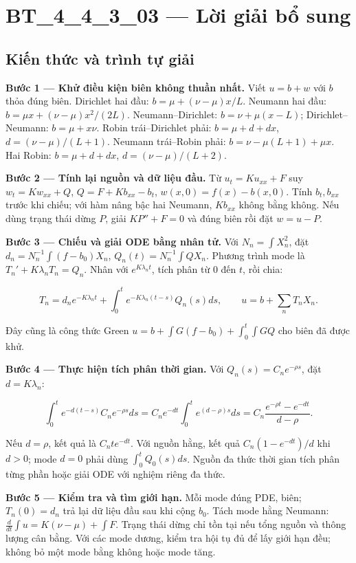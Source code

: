 \documentclass[10pt,a4paper]{article}
\begin{document}
\section*{BT\_4\_4\_3\_03 — Lời giải bổ sung}
\subsection*{Kiến thức và trình tự giải}
\textbf{Bước 1 — Khử điều kiện biên không thuần nhất.} Viết $u=b+w$ với $b$ thỏa đúng biên. Dirichlet hai đầu: $b=\mu+(\nu-\mu)x/L$. Neumann hai đầu: $b=\mu x+(\nu-\mu)x^2/(2L)$. Neumann–Dirichlet: $b=\nu+\mu(x-L)$; Dirichlet–Neumann: $b=\mu+x\nu$. Robin trái–Dirichlet phải: $b=\mu+d+dx$, $d=(\nu-\mu)/(L+1)$. Neumann trái–Robin phải: $b=\nu-\mu(L+1)+\mu x$. Hai Robin: $b=\mu+d+dx$, $d=(\nu-\mu)/(L+2)$.

\textbf{Bước 2 — Tính lại nguồn và dữ liệu đầu.} Từ $u_t=Ku_{xx}+F$ suy $w_t=Kw_{xx}+Q$, $Q=F+Kb_{xx}-b_t$, $w(x,0)=f(x)-b(x,0)$. Tính $b_t,b_{xx}$ trước khi chiếu; với hàm nâng bậc hai Neumann, $Kb_{xx}$ không bằng không. Nếu dùng trạng thái dừng $P$, giải $KP''+F=0$ và đúng biên rồi đặt $w=u-P$.

\textbf{Bước 3 — Chiếu và giải ODE bằng nhân tử.} Với $N_n=\int X_n^2$, đặt $d_n=N_n^{-1}\int(f-b_0)X_n$, $Q_n(t)=N_n^{-1}\int QX_n$. Phương trình mode là $T_n'+K\lambda_nT_n=Q_n$. Nhân với $e^{K\lambda_nt}$, tích phân từ $0$ đến $t$, rồi chia:


\[
T_n=d_ne^{-K\lambda_nt}+\int_0^te^{-K\lambda_n(t-s)}Q_n(s)ds,\qquad
u=b+\sum_nT_nX_n.
\]


Đây cũng là công thức Green $u=b+\int G(f-b_0)+\int_0^t\int GQ$ cho biên đã được khử.

\textbf{Bước 4 — Thực hiện tích phân thời gian.} Với $Q_n(s)=C_ne^{-\rho s}$, đặt $d=K\lambda_n$:


\[
\int_0^te^{-d(t-s)}C_ne^{-\rho s}ds
=C_ne^{-dt}\int_0^te^{(d-\rho)s}ds
=C_n\frac{e^{-\rho t}-e^{-dt}}{d-\rho}.
\]


Nếu $d=\rho$, kết quả là $C_nte^{-dt}$. Với nguồn hằng, kết quả $C_n(1-e^{-dt})/d$ khi $d>0$; mode $d=0$ phải dùng $\int_0^tQ_0(s)ds$. Nguồn đa thức thời gian tích phân từng phần hoặc giải ODE với nghiệm riêng đa thức.

\textbf{Bước 5 — Kiểm tra và tìm giới hạn.} Mỗi mode đúng PDE, biên; $T_n(0)=d_n$ trả lại dữ liệu đầu sau khi cộng $b_0$. Tách mode hằng Neumann: $\frac d{dt}\int u=K(\nu-\mu)+\int F$. Trạng thái dừng chỉ tồn tại nếu tổng nguồn và thông lượng cân bằng. Với các mode dương, kiểm tra hội tụ đủ để lấy giới hạn đều; không bỏ một mode bằng không hoặc mode tăng.
\end{document}
